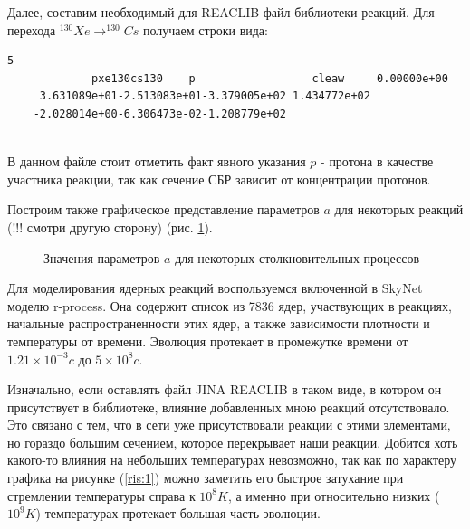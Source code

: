 \documentclass[%
master,    %
natbib,      %
subf,        %
href,        %
colorlinks,  %
]{disser}
\begin{document}
Далее, составим необходимый для REACLIB файл библиотеки реакций. Для перехода $^{130}Xe \to ^{130}Cs$ получаем строки вида: 

\begin{lstlisting}[label={lst:label}]
	5
	         pxe130cs130    p                  cleaw     0.00000e+00          
	 3.631089e+01-2.513083e+01-3.379005e+02 1.434772e+02                      
	-2.028014e+00-6.306473e-02-1.208779e+02                                   
	
\end{lstlisting}

В данном файле стоит отметить факт явного указания $p$ - протона в качестве участника реакции, так как сечение СБР зависит от концентрации протонов. 

Построим также графическое представление параметров $a$ для некоторых реакций (!!! смотри другую сторону) (рис. \ref{ris:result-a}).

\begin{figure}[h]
	\caption{Значения параметров $a$ для некоторых столкновительных процессов}
	\label{ris:result-a}
\end{figure}

Для моделирования ядерных реакций воспользуемся включенной в SkyNet моделю r-process. Она содержит список из 7836 ядер, участвующих в реакциях, начальные распространенности этих ядер, а также зависимости плотности и температуры от времени. Эволюция протекает в промежутке времени от $1.21\times 10^{-3}c$ до $5\times 10^8c$. 

Изначально, если оставлять файл JINA REACLIB в таком виде, в котором он присутствует в библиотеке, влияние добавленных мною реакций отсутствовало. Это связано с тем, что в сети уже присутствовали реакции с этими элементами, но гораздо большим сечением, которое перекрывает наши реакции. Добится хоть какого-то влияния на небольших температурах невозможно, так как по характеру графика на рисунке (\ref{ris:1}) можно заметить его быстрое затухание при стремлении температуры справа к $10^8 K$, а именно при относительно низких ($10^9 K$) температурах протекает большая часть эволюции.
\end{document}
